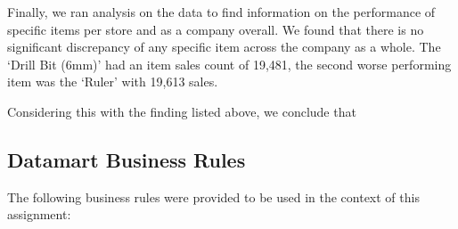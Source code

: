 \documentclass{article}
\begin{document}
	Finally, we ran analysis on the data to find information on the performance of specific items per store and as a company overall. We found that there is no significant discrepancy of any specific item across the company as a whole. The `Drill Bit (6mm)' had an item sales count of 19,481, the second worse performing item was the `Ruler' with 19,613 sales. 
	 
	 Considering this with the finding listed above, we conclude that 
    
	
\newpage



    \subsection{Datamart Business Rules}
    The following business rules were provided to be used in the context of this assignment:
\end{document}
